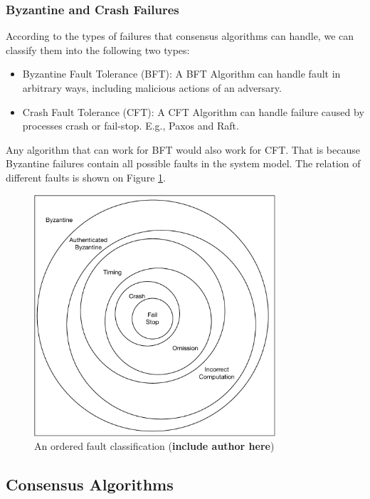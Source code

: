 \documentclass[12pt, a4paper]{article}
\begin{document}
\subsubsection{Byzantine and Crash Failures}

According to the types of failures that consensus algorithms can handle, we can
classify them into the following two types:

\begin{itemize}
	\item Byzantine Fault Tolerance (BFT): A BFT Algorithm can handle fault in
    arbitrary ways, including malicious actions of an adversary.
	\item Crash Fault Tolerance (CFT): A CFT Algorithm can handle failure caused
    by processes crash or fail-stop. E.g., Paxos and Raft.
\end{itemize}

Any algorithm that can work for BFT would also work for CFT. That is because
Byzantine failures contain all possible faults in the system model. The relation
of different faults \cite{barborak1993consensus} is shown on Figure
\ref{fig:aofc}.

\begin{figure}[htp]
  \centering
  \includegraphics[width=0.8\textwidth]{img/AOFC.pdf}
  \caption{An ordered fault classification (\textbf{include author here})}
  \label{fig:aofc}
\end{figure}

\subsection{Consensus Algorithms}
\end{document}
